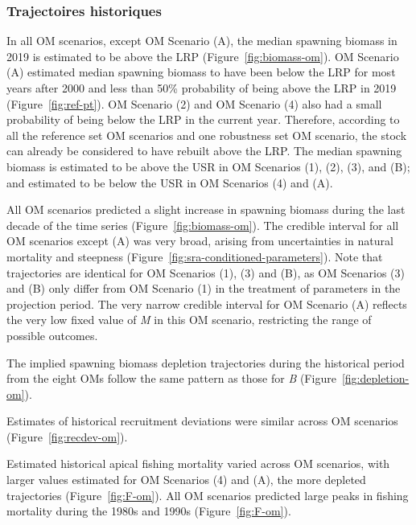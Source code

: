 \documentclass[11pt]{book}
\begin{document}
\hypertarget{sec:approach3-conditioning-trajectories}{%
\subsubsection{Trajectoires historiques}\label{sec:approach3-conditioning-trajectories}}

In all OM scenarios, except OM Scenario (A), the median spawning biomass in 2019 is estimated to be above the LRP (Figure~\ref{fig:biomass-om}). OM Scenario (A) estimated median spawning biomass to have been below the LRP for most years after 2000 and less than 50\% probability of being above the LRP in 2019 (Figure~\ref{fig:ref-pt}). OM Scenario (2) and OM Scenario (4) also had a small probability of being below the LRP in the current year. Therefore, according to all the reference set OM scenarios and one robustness set OM scenario, the stock can already be considered to have rebuilt above the LRP. The median spawning biomass is estimated to be above the USR in OM Scenarios (1), (2), (3), and (B); and estimated to be below the USR in OM Scenarios (4) and (A).

All OM scenarios predicted a slight increase in spawning biomass during the last decade of the time series (Figure~\ref{fig:biomass-om}). The credible interval for all OM scenarios except (A) was very broad, arising from uncertainties in natural mortality and steepness (Figure~\ref{fig:sra-conditioned-parameters}). Note that trajectories are identical for OM Scenarios (1), (3) and (B), as OM Scenarios (3) and (B) only differ from OM Scenario (1) in the treatment of parameters in the projection period. The very narrow credible interval for OM Scenario (A) reflects the very low fixed value of \emph{M} in this OM scenario, restricting the range of possible outcomes.

The implied spawning biomass depletion trajectories during the historical period from the eight OMs follow the same pattern as those for \emph{B} (Figure~\ref{fig:depletion-om}).

Estimates of historical recruitment deviations were similar across OM scenarios (Figure~\ref{fig:recdev-om}).

Estimated historical apical fishing mortality varied across OM scenarios, with larger values estimated for OM Scenarios (4) and (A), the more depleted trajectories (Figure~\ref{fig:F-om}). All OM scenarios predicted large peaks in fishing mortality during the 1980s and 1990s (Figure~\ref{fig:F-om}).
\end{document}
